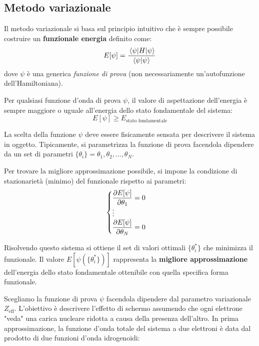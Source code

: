 \subsection{Metodo variazionale}

Il metodo variazionale si basa sul principio intuitivo che è sempre possibile costruire un \textbf{funzionale energia} definito come:
\begin{equation}
    E[\psi] = \frac{\mel{\psi}{H}{\psi}}{\braket{\psi}{\psi}}
\end{equation}
dove \(\psi\) è una generica \textit{funzione di prova} (non necessariamente un'autofunzione dell'Hamiltoniana).

Per qualsiasi funzione d'onda di prova \(\psi\), il valore di aspettazione dell'energia è sempre maggiore o uguale all'energia dello stato fondamentale del sistema:
\begin{equation}
    E[\psi] \ge E_{\text{stato fondamentale}}
\end{equation}

La scelta della funzione \(\psi\) deve essere fisicamente sensata per descrivere il sistema in oggetto. Tipicamente, si parametrizza la funzione di prova facendola dipendere da un set di parametri \(\{\theta_i\} = \theta_1, \theta_2, \dots, \theta_N\).

Per trovare la migliore approssimazione possibile, si impone la condizione di stazionarietà (minimo) del funzionale rispetto ai parametri:
\begin{equation}
    \begin{cases}
        \displaystyle \pdv{E[\psi]}{\theta_1} = 0 \\
        \vdots \\
        \displaystyle \pdv{E[\psi]}{\theta_N} = 0
    \end{cases}
\end{equation}

Risolvendo questo sistema si ottiene il set di valori ottimali \(\{\theta_i^*\}\) che minimizza il funzionale. Il valore \(E[\psi(\{\theta_i^*\})]\) rappresenta la \textbf{migliore approssimazione} dell'energia dello stato fondamentale ottenibile con quella specifica forma funzionale.

Scegliamo la funzione di prova \(\psi\) facendola dipendere dal parametro variazionale \(Z_{\text{eff}}\). L'obiettivo è descrivere l'effetto di schermo assumendo che ogni elettrone "veda" una carica nucleare ridotta a causa della presenza dell'altro. In prima approssimazione, la funzione d'onda totale del sistema a due elettroni è data dal prodotto di due funzioni d'onda idrogenoidi:

